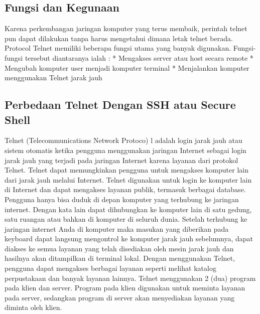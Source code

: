 \subsection {Fungsi dan Kegunaan}

Karena perkembangan jaringan komputer yang terus membaik, perintah telnet pun dapat dilakukan tanpa harus mengetahui dimana letak telnet berada. Protocol Telnet memiliki beberapa fungsi utama yang banyak digunakan. Fungsi-fungsi tersebut diantaranya ialah :
* Mengakses server atau host secara remote
* Mengubah komputer user menjadi komputer terminal
* Menjalankan komputer menggunakan Telnet jarak jauh

\subsection {Perbedaan Telnet Dengan SSH atau Secure Shell}

Telnet (Telecommunications Network Protoco) l adalah login jarak jauh atau sistem otomatis ketika pengguna menggunakan jaringan Internet sebagai login jarak jauh yang terjadi pada jaringan Internet karena layanan dari protokol Telnet. Telnet dapat memungkinkan pengguna untuk mengakses komputer lain dari jarak jauh melalui Internet. Telnet digunakan untuk login ke komputer lain di Internet dan dapat mengakses layanan publik, termasuk berbagai database. Pengguna hanya bisa duduk di depan komputer yang terhubung ke jaringan internet. Dengan kata lain dapat dihubungkan ke komputer lain di satu gedung, satu ruangan atau bahkan di komputer di seluruh dunia. Setelah terhubung ke jaringan internet Anda di komputer maka masukan yang diberikan pada keyboard dapat langsung mengontrol ke komputer jarak jauh sebelumnya, dapat diakses ke semua layanan yang telah disediakan oleh mesin jarak jauh dan hasilnya akan ditampilkan di terminal lokal. Dengan menggunakan Telnet, pengguna dapat mengakses berbagai layanan seperti melihat katalog perpustakaan dan banyak layanan lainnya. Telnet menggunakan 2 (dua) program pada klien dan server. Program pada klien digunakan untuk meminta layanan pada server, sedangkan program di server akan menyediakan layanan yang diminta oleh klien.